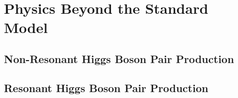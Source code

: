 \section{Physics Beyond the Standard Model}

\subsection{Non-Resonant Higgs Boson Pair Production}



\subsection{Resonant Higgs Boson Pair Production}



